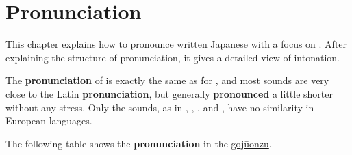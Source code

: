 \chapter{Pronunciation}
\label{chap:Pronunciation}\label{sec:Pronunciation}

This chapter explains how to pronounce written Japanese with a focus on
\jkanavoc. After explaining the structure of pronunciation, it gives a detailed
view of intonation.

The \textbf{pronunciation} of \jkanavoc is exactly the same as for
\hyperref[sec:\jscript]{\jtopic}, and most sounds are very close to the Latin
\textbf{pronunciation}, but generally \textbf{pronounced} a little shorter
without any stress. Only the  sounds, as in , ,
,  and , have no similarity in European languages.



The following table shows the \textbf{pronunciation} in the
\hyperref[sec:Gojuonzu]{gojūonzu}.

